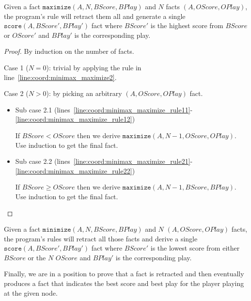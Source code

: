\begin{lemma}
Given a fact $\mathtt{maximize}(A, N, BScore, BPlay)$ and $N$ facts
$(A, OScore, OPlay)$, the program's rule will retract
them all and generate a single 
$\mathtt{score}(A, BScore', BPlay')$ fact where $BScore'$ is the
highest score from $BScore$ or $OScore'$ and
$BPlay'$ is the corresponding play.
\end{lemma}
\begin{proof}
By induction on the number of  facts.

Case 1 ($N = 0$): trivial by applying the rule in
line~\ref{line:coord:minimax_maximize2}.

Case 2 ($N > 0$): by picking an arbitrary $(A, OScore,
OPlay)$ fact.

\begin{itemize}
   \item Sub case 2.1
      (lines~\ref{line:coord:minimax_maximize_rule11}-\ref{line:coord:minimax_maximize_rule12})

      If $BScore < OScore$ then we derive $\mathtt{maximize}(A, N-1,
      OScore, OPlay)$. Use induction to get the final  fact.

   \item Sub case 2.2
      (lines~\ref{line:coord:minimax_maximize_rule21}-\ref{line:coord:minimax_maximize_rule22})

      If $BScore \geq OScore$ then we derive $\mathtt{maximize}(A, N-1,
      BScore, BPlay)$. Use induction to get the final  fact.

\end{itemize}

\end{proof}

\begin{lemma}

Given a fact $\mathtt{minimize}(A, N, BScore, BPlay)$ and $N$
$(A, OScore, OPlay)$ facts, the program's rules will retract all
those facts and derive a single $\mathtt{score}(A, BScore', BPlay')$ fact
where $BScore'$ is the lowest score from either $BScore$ or the $N$
$OScore$ and $BPlay'$ is the corresponding play.

\end{lemma}

Finally, we are in a position to prove that a  fact is retracted and
then eventually produces a  fact that indicates the best score and
best play for the player playing at the given node.

